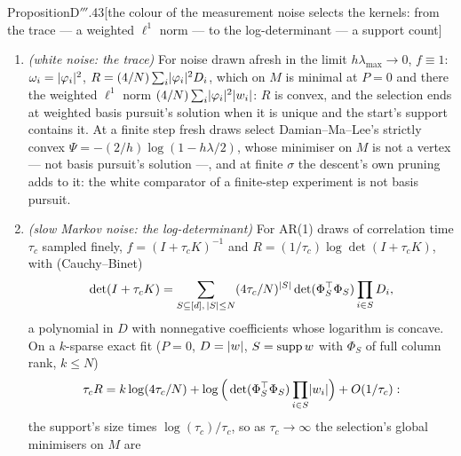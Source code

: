 \begin{thm}{Proposition}{D$'''$.43}[the colour of the measurement noise selects the kernels: from the trace --- a
weighted $\ell^1$ norm --- to the log-determinant --- a support count]
\begin{enumerate}[label=\textup{(\roman*)}]
    \begin{gather*}
      \frac{\dd P}{\dd s} = -\omega\odot P,\qquad \frac{\dd w}{\dd s} = -\Pi_D(\omega\odot w),\\
      \omega_i = \varphi_i^\T f(K)\varphi_i,\qquad \Pi_D = I - D\Phi^\T(\Phi D\Phi^\T)^{-1}\Phi,
    \end{gather*}
    the gradient flow on $M$, in the flat metric ($\operatorname{diag}(1/(4D),1/D)$ in $(w,P)$), of
    $R = \tr\Psi(K)$, $\Psi' = f$ the filter of \hyperref[res:thmDppp:41]{Proposition D$'''$.41}(iv): the cancellations
    decay at the rates $\omega_i$ (the measure's decomposition becoming minimal, $D\to\abs w$) while $w$ moves along
    $M$, reweighted by $\omega$ --- the gradient of $R$ in the relevances, $\partial R/\partial D_i = (4/N)\omega_i$.
    The flow is the small-noise limit of the descent ($\sigma\ll\min\abs{w^*_S}\sigma_{\min}(\Phi_S)$ in practice; at
    larger $\sigma$ the descent kills atoms on its own, Lasso-like), and its time unit $s = 4v_ht/N$ costs about $10^4$
    updates here ($3\cdot10^6$ for $s = 300$).
  \item \emph{(white noise: the trace)} For noise drawn afresh in the limit $h\lambda_{\max}\to0$, $f\equiv1$:
    $\omega_i = \lvert \varphi_i\rvert^2$, $R = (4/N)\sum_i\lvert \varphi_i\rvert^2D_i$, which on $M$ is minimal at $P = 0$ and there
    the weighted $\ell^1$ norm $(4/N)\sum_i\lvert \varphi_i\rvert^2\lvert w_i\rvert$: $R$ is convex, and the selection ends at weighted
    basis pursuit's solution when it is unique and the start's support contains it. At a finite step fresh draws select
    Damian--Ma--Lee's strictly convex $\Psi = -(2/h)\log(1 - h\lambda/2)$, whose minimiser on $M$ is not a vertex ---
    not basis pursuit's solution ---, and at finite $\sigma$ the descent's own pruning adds to it: the white comparator of
    a finite-step experiment is not basis pursuit.
  \item \emph{(slow Markov noise: the log-determinant)} For AR(1) draws of correlation time $\tau_c$ sampled finely,
    $f = (I + \tau_cK)^{-1}$ and $R = (1/\tau_c)\log\det(I + \tau_cK)$, with (Cauchy--Binet)
    \[
      \det(I + \tau_cK) = \sum_{S\subseteq[d],\,\lvert S\rvert\le N}(4\tau_c/N)^{\lvert S\rvert}\det(\Phi_S^\top\Phi_S)\prod_{i\in S}D_i,
    \]
    a polynomial in $D$ with nonnegative coefficients whose logarithm is concave. On a $k$-sparse exact fit ($P = 0$,
    $D = \lvert w\rvert$, $S = \operatorname{supp} w$ with $\Phi_S$ of full column rank, $k\le N$)
    \[
      \tau_cR = k\log(4\tau_c/N) + \log\Big(\det(\Phi_S^\top\Phi_S)\prod_{i\in S}\lvert w_i\rvert\Big) + O(1/\tau_c):
    \]
    the support's size times $\log(\tau_c)/\tau_c$, so as $\tau_c\to\infty$ the selection's global minimisers on $M$ are

\end{enumerate}
\end{thm}

